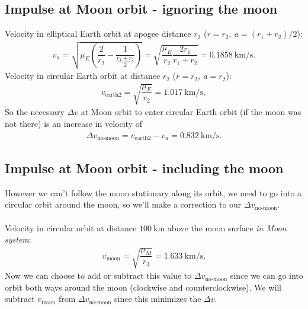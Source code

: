 \subsection{Impulse at Moon orbit - ignoring the moon}
Velocity in elliptical Earth orbit at apogee distance $r_2$ ($r = r_2,\ a = (r_1+r_2)/2$):
\begin{align}
v_a = \sqrt{\mu_E\left(\dfrac{2}{r_2} - \dfrac{1}{\frac{r_1+r_2}{2}}\right)} = \sqrt{\dfrac{\mu_E}{r_2} \dfrac{2 r_1}{r_1+r_2}} = \SI{0.1858}{\km\per\s}. \label{eq:va}
\end{align}
Velocity in circular Earth orbit at distance $r_2$ ($r = r_2,\ a = r_2$):
\begin{align}
v_{\text{earth2}} = \sqrt{\dfrac{\mu_E}{r_2}} = \SI{1.017}{\km\per\s},
\end{align}
So the necessary $\Delta v$ at Moon orbit to enter circular Earth orbit (if the moon was not there) is an increase in velocity of
\begin{align}
\Delta v_{\text{no-moon}} = v_{\text{earth2}} - v_a = \SI{0.832}{\km\per\s}.
\end{align}

\subsection{Impulse at Moon orbit - including the moon}
However we can't follow the moon stationary along its orbit, we need to go into a circular orbit around the moon, so we'll make a correction to our $\Delta v_{\text{no-moon}}$.\\
\\
Velocity in circular orbit at distance $\SI{100}{\km}$ above the moon surface \emph{in Moon system}:
\begin{align}
v_{\text{moon}} = \sqrt{\dfrac{\mu_M}{r_3}} = \SI{1.633}{\km\per\s}.
\end{align}
Now we can choose to add or subtract this value to $\Delta v_{\text{no-moon}}$ since we can go into orbit both ways around the moon (clockwise and counterclockwise). We will subtract $v_{\text{moon}}$ from $\Delta v_{\text{no-moon}}$ since this minimizes the $\Delta v$.

